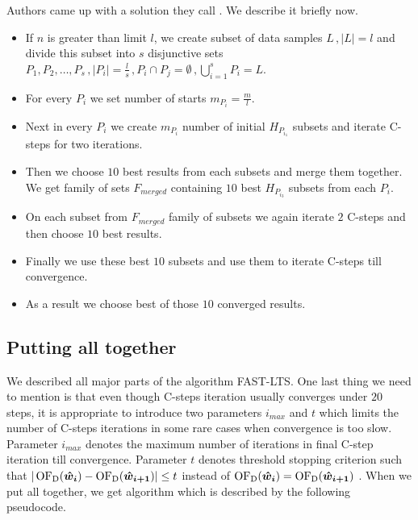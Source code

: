 Authors came up with a solution they call . We describe it briefly now.
\begin{itemize}
    \item If $n$ is greater than limit $l$, we create subset of data samples $L\,, |L| = l$ and divide this subset into $s$ disjunctive sets $P_1,P_2,\ldots,P_s\,, |P_i| = \frac{l}{s}\,, P_i\cap P_j  = \emptyset\,, \bigcup_{i=1}^{s} P_{i} = L$.
    \item For every $P_i$ we set number of starts $m_{P_i} = \frac{m}{l}$. 
    \item Next in every $P_i$ we create $m_{P_i}$ number of initial $H_{P_{i_1}}$ subsets and iterate C-steps for two iterations.
    \item Then we choose $10$ best results from each subsets and merge them together. We get family of sets
    $F_{merged}$ containing $10$ best $H_{P_{i_3}}$ subsets from each $P_i$.
    \item On each subset from  $F_{merged}$ family of subsets we again iterate $2$ C-steps and then choose $10$ best results.
    \item Finally we use these best $10$ subsets and use them to iterate C-steps till convergence.
    \item As a result we choose best of those $10$ converged results.
\end{itemize} 



\subsection{Putting all together}
We described all major parts of the algorithm FAST-LTS. One last thing we need to mention is that even though C-steps iteration usually converges under $20$ steps, it is appropriate to introduce two parameters 
$i_{max}$ and $t$ which limits the number of C-steps iterations in some rare cases when convergence is too slow. Parameter $i_{max}$ denotes the maximum number of iterations in final C-step iteration till convergence. Parameter $t$ denotes threshold stopping criterion such that $| \operatorname{OF_D}(\boldsymbol{\hat{w}_{i}}) - \operatorname{OF_D}(\boldsymbol{\hat{w}_{i+1}})| \leq t$ instead of 
$\operatorname{OF_D}(\boldsymbol{\hat{w}_{i}}) = \operatorname{OF_D}(\boldsymbol{\hat{w}_{i+1}})$ . When we put all together, we get  algorithm which is described by the following pseudocode.

